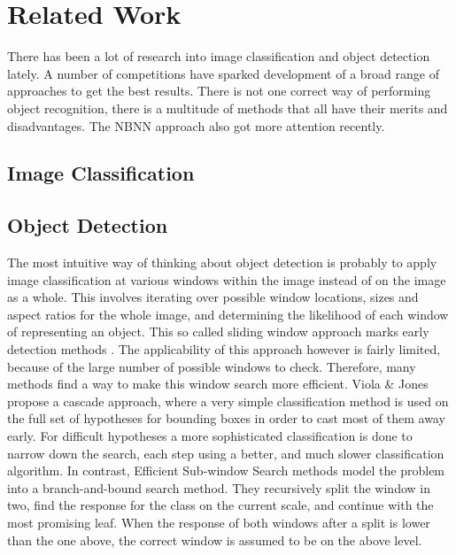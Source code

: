 \section{Related Work} %
\label{cha:related_work}
There has been a lot of research into image classification and object detection lately. A number of competitions have sparked development of a broad range of approaches to get the best results. There is not one correct way of performing object recognition, there is a multitude of methods that all have their merits and disadvantages. The NBNN approach also got more attention recently.

\subsection{Image Classification} %
\label{sec:image_classification}



\subsection{Object Detection} %
\label{sec:object_detection}


The most intuitive way of thinking about object detection is probably to apply image classification at various windows within the image instead of on the image as a whole. This involves iterating over possible window locations, sizes and aspect ratios for the whole image, and determining the likelihood of each window of representing an object. This so called sliding window approach marks early detection methods \cite{viola2004robust}. The applicability of this approach however is fairly limited, because of the large number of possible windows to check. Therefore, many methods find a way to make this window search more efficient. Viola \& Jones \cite{viola2004robust} propose a cascade approach, where a very simple classification method is used on the full set of hypotheses for bounding boxes in order to cast most of them away early. For difficult hypotheses a more sophisticated classification is done to narrow down the search, each step using a better, and much slower classification algorithm. In contrast, Efficient Sub-window Search methods \cite{behmo2010towards, lampert2008beyond, pedersoli2011coarse, yeh2009fast} model the problem into a branch-and-bound search method. They recursively split the window in two, find the response for the class on the current scale, and continue with the most promising leaf. When the response of both windows after a split is lower than the one above, the correct window is assumed to be on the above level.

